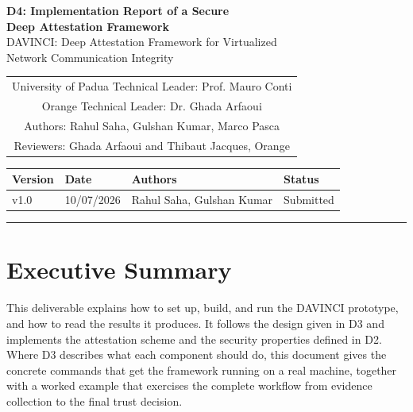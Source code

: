 \documentclass[11pt,a4paper]{article}
\begin{document}
\thispagestyle{plain}
\begin{center}
  {\LARGE\bfseries D4: Implementation Report of a Secure\\[3pt]
   Deep Attestation Framework}\\[12pt]
  {\large DAVINCI: Deep Attestation Framework for Virtualized\\[2pt]
   Network Communication Integrity}\\[18pt]
\end{center}

\begin{center}
\begin{tabular}{c}
University of Padua Technical Leader: Prof. Mauro Conti\\[3pt]
Orange Technical Leader: Dr. Ghada Arfaoui\\[3pt]
Authors: Rahul Saha, Gulshan Kumar, Marco Pasca\\[3pt]
Reviewers: Ghada Arfaoui and Thibaut Jacques, Orange\\
\end{tabular}
\end{center}

\vspace{12pt}

\begin{center}
\begin{tabularx}{\textwidth}{l l X l}
\toprule
\textbf{Version} & \textbf{Date} & \textbf{Authors} & \textbf{Status}\\
\midrule
v1.0 & 10/07/2026 & Rahul Saha, Gulshan Kumar & Submitted\\
\bottomrule
\end{tabularx}
\end{center}

\vspace{10pt}
\hrule
\vspace{4pt}

\section{Executive Summary}

This deliverable explains how to set up, build, and run the DAVINCI prototype,
and how to read the results it produces. It follows the design given in D3 and
implements the attestation scheme and the security properties defined in D2.
Where D3 describes what each component should do, this document gives the
concrete commands that get the framework running on a real machine, together
with a worked example that exercises the complete workflow from evidence
collection to the final trust decision.
\end{document}
